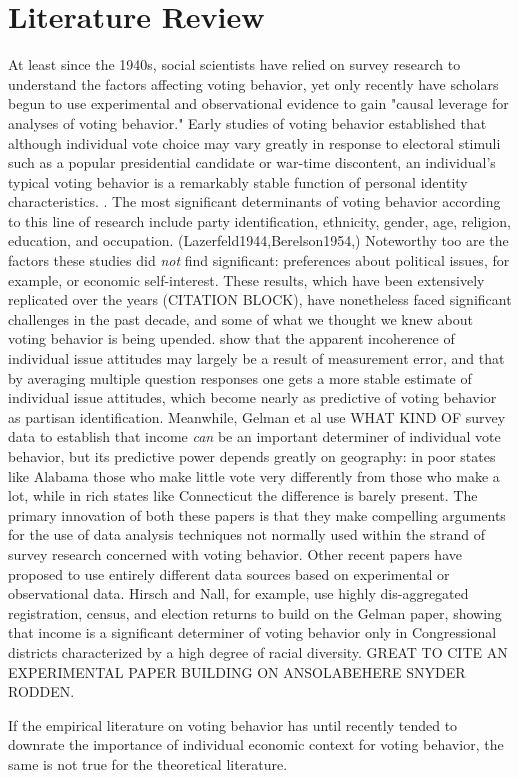\section{Literature Review}

At least since the 1940s, social scientists have relied on survey research to understand the factors affecting voting behavior, yet only recently have scholars begun to use experimental and observational evidence to gain "causal leverage for analyses of voting behavior." \cite{bartels_larry_m._study_2010} Early studies of voting behavior established that although individual vote choice may vary greatly in response to electoral stimuli such as a popular presidential candidate or war-time discontent, an individual's typical voting behavior is a remarkably stable function of personal identity characteristics. \cite{ConverseNormalVote}. The most significant determinants of voting behavior according to this line of research include party identification, ethnicity, gender, age, religion, education, and occupation. (Lazerfeld1944,Berelson1954,) Noteworthy too are the factors these studies did \textit{not} find significant: preferences about political issues, for example, or economic self-interest. These results, which have been extensively replicated over the years (CITATION BLOCK), have nonetheless faced significant challenges in the past decade, and some of what we thought we knew about voting behavior is being upended. \cite{Ansolabehere_Snyder_Rodden} show that the apparent incoherence of individual issue attitudes may largely be a result of measurement error, and that by averaging multiple question responses one gets a more stable estimate of individual issue attitudes, which become nearly as predictive of voting behavior as partisan identification. Meanwhile, Gelman et al use WHAT KIND OF survey data to establish that income \textit{can} be an important determiner of individual vote behavior, but its predictive power depends greatly on geography: in poor states like Alabama those who make little vote very differently from those who make a lot, while in rich states like Connecticut the difference is barely present. The primary innovation of both these papers is that they make compelling arguments for the use of data analysis techniques not normally used within the strand of survey research concerned with voting behavior. Other recent papers have proposed to use entirely different data sources based on experimental or observational data. Hirsch and Nall, for example, use highly dis-aggregated registration, census, and election returns to build on the Gelman paper, showing that income is a significant determiner of voting behavior only in Congressional districts characterized by a high degree of racial diversity.  GREAT TO CITE AN EXPERIMENTAL PAPER BUILDING ON ANSOLABEHERE SNYDER RODDEN.

If the empirical literature on voting behavior has until recently tended to downrate the importance of individual economic context for voting behavior, the same is not true for the theoretical literature.

